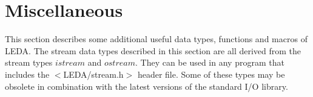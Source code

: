 \chapter{Miscellaneous} \label{Miscellaneous}

This section describes some additional useful data types, functions and
macros of LEDA. 
The stream data types described in this section are all derived from
the \CC stream types $istream$ and $ostream$. They can be used in any 
program that includes the $<$LEDA/stream.h$>$ header file. Some of these types 
may be obsolete in combination with the latest versions of the 
standard \CC I/O library.


\newpage

\newpage

\newpage

\newpage


